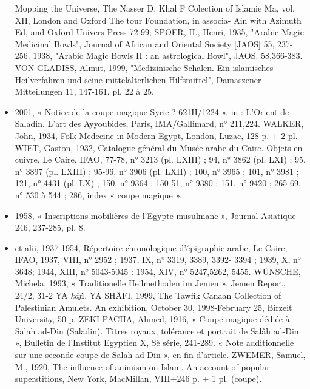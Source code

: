 \begin{itemize}
Mopping the Universe, The Nasser D. Khal F Colection of Islamie
Ma, vol. XII, London and Oxford The tour Foundation, in associa-
Ain with Azimuth Ed, and Oxford Univers Press 72-99;
SPOER, H., Henri, 1935, "Arabic Magie Medicinal Bowls", Journal of
African and Oriental Society [JAOS] 55, 237-256.
1938, "Arabic Magic Bowls II : an astrological Bowl", JAOS.
58,366-383.
VON GLADISS, Almut, 1999, "Medizinische Schalen. Ein islamisches
Heilverfahren und seine mittelalterlichen Hilfsmittel", Damaszener
Mitteilungen 11, 147-161, pl. 22 à 25.
\item 2001, « Notice de la coupe magique Syrie ? 621H/1224 », in : L'Orient de Saladin. L'art des Ayyoubides, Paris, IMA/Gallimard, n° 211,224.
WALKER, John, 1934, Folk Medecine in Modern Egypt, London, Luzac, 128 p. + 2 pl.
WIET, Gaston, 1932, Catalogue général du Musée arabe du Caire.
Objets en cuivre, Le Caire, IFAO, 77-78, n° 3213 (pl. LXIII) ; 94,
n° 3862 (pl. LXI) ; 95, n° 3897 (pl. LXIII) ; 95-96, n° 3906 (pl. LXII) ;
100, n° 3965 ; 101, n° 3981 ; 121, n° 4431 (pl. LX) ; 150, n° 9364 ;
150-51, n° 9380 ; 151, n° 9420 ; 265-69, n° 530 à 544 ; 286, index « coupe magique ».
\item 1958, « Inscriptions mobilières de l'Egypte musulmane », Journal Asiatique 246, 237-285, pl. 8.
\item et alii, 1937-1954, Répertoire chronologique d'épigraphie arabe, Le Caire, IFAO, 1937, VIII, n° 2952 ; 1937, IX, n° 3319, 3389, 3392-
3394 ; 1939, X, n° 3648; 1944, XIII, n° 5043-5045 : 1954, XIV, n° 5247,5262, 5455.
WÜNSCHE, Michela, 1993, « Traditionelle Heilmethoden im Jemen »,
Jemen Report, 24/2, 31-2
YA \textit{kâf}I, YA SHÄFI, 1999, The Tawfik Canaan Collection of Palestinian
Amulets. An exhibition, October 30, 1998-February 25, Birzeit University, 50 p.
ZEKI PACHA, Ahmed, 1916, « Coupe magique dédiée à Salah ad-Din (Saladin). Titres royaux, tolérance et portrait de Salâh ad-Din », Bulletin de l'Institut Egyptien X, Sè série, 241-289. « Note additionnelle sur une seconde coupe de Salah ad-Din », en fin d'article.
ZWEMER, Samuel, M., 1920, The influence of animism on Islam. An account of popular superstitions, New York, MacMillan, VIII+246
p. + 1 pl. (coupe).
\end{itemize}
 
